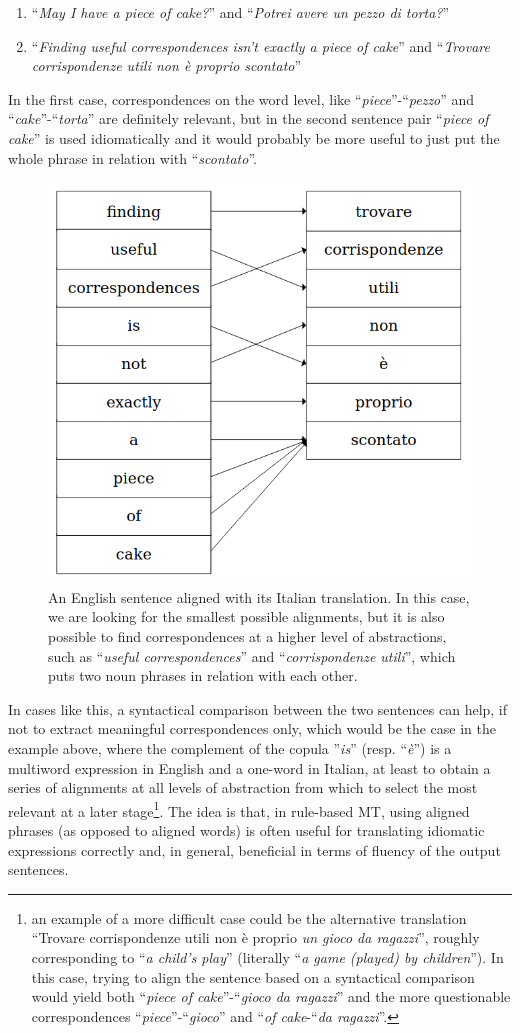 \begin{enumerate}
    \item ``\textit{May I have a piece of cake?}'' and ``\textit{Potrei avere un pezzo di torta?}''
    \item ``\textit{Finding useful correspondences isn't exactly a piece of cake}'' and ``\textit{Trovare corrispondenze utili non è proprio scontato}''
\end{enumerate} \smallskip

In the first case, correspondences on the word level, like ``\textit{piece}''-``\textit{pezzo}'' and ``\textit{cake}''-``\textit{torta}'' are definitely relevant, but in the second sentence pair ``\textit{piece of cake}'' is used idiomatically and it would probably be more useful to just put the whole phrase in relation with ``\textit{scontato}''. \smallskip

\begin{figure}[H]
    \centering
    \includegraphics[width=.4\linewidth]{figure/alignment.png}
    \caption[An English sentence aligned with its Italian translation]{An English sentence aligned with its Italian translation. In this case, we are looking for the smallest possible alignments, but it is also possible to find correspondences at a higher level of abstractions, such as ``\textit{useful correspondences}'' and ``\textit{corrispondenze utili}'', which puts two noun phrases in relation with each other.} \label{cake}
\end{figure}

In cases like this, a syntactical comparison between the two sentences can help, if not to extract meaningful correspondences only, which would be the case in the example above, where the complement of the copula ''\textit{is}'' (resp. ``\textit{è}'') is a multiword expression in English and a one-word in Italian, at least to obtain a series of alignments at all levels of abstraction from which to select the most relevant at a later stage\footnote{an example of a more difficult case could be the alternative translation ``Trovare corrispondenze utili non è proprio \textit{un gioco da ragazzi}'', roughly corresponding to ``\textit{a child's play}'' (literally ``\textit{a game (played) by children}''). In this case, trying to align the sentence based on a syntactical comparison would yield both ``\textit{piece of cake}''-``\textit{gioco da ragazzi}'' and the more questionable correspondences ``\textit{piece}''-``\textit{gioco}'' and ``\textit{of cake}-``\textit{da ragazzi}''.}. 
The idea is that, in rule-based MT, using aligned phrases (as opposed to aligned words) is often useful for translating idiomatic expressions correctly and, in general, beneficial in terms of fluency of the output sentences.\smallskip
 
